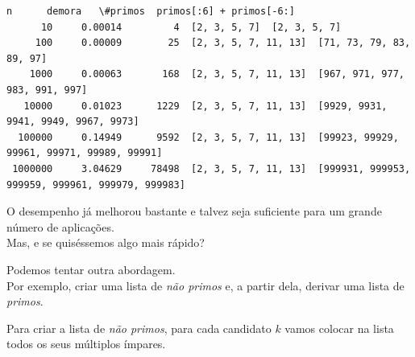 \documentclass[11pt,a4paper]{article}
\begin{document}
    \begin{Verbatim}[commandchars=\\\{\}]
       n      demora   \#primos  primos[:6] + primos[-6:]
      10     0.00014         4  [2, 3, 5, 7]  [2, 3, 5, 7]
     100     0.00009        25  [2, 3, 5, 7, 11, 13]  [71, 73, 79, 83, 89, 97]
    1000     0.00063       168  [2, 3, 5, 7, 11, 13]  [967, 971, 977, 983, 991, 997]
   10000     0.01023      1229  [2, 3, 5, 7, 11, 13]  [9929, 9931, 9941, 9949, 9967, 9973]
  100000     0.14949      9592  [2, 3, 5, 7, 11, 13]  [99923, 99929, 99961, 99971, 99989, 99991]
 1000000     3.04629     78498  [2, 3, 5, 7, 11, 13]  [999931, 999953, 999959, 999961, 999979, 999983]

    \end{Verbatim}

    O desempenho já melhorou bastante e talvez seja suficiente para um
grande número de aplicações.\\
Mas, e se quiséssemos algo mais rápido?

Podemos tentar outra abordagem.\\
Por exemplo, criar uma lista de \emph{não primos} e, a partir dela,
derivar uma lista de \emph{primos}.

Para criar a lista de \emph{não primos}, para cada candidato \(k\) vamos
colocar na lista todos os seus múltiplos ímpares.
\end{document}
